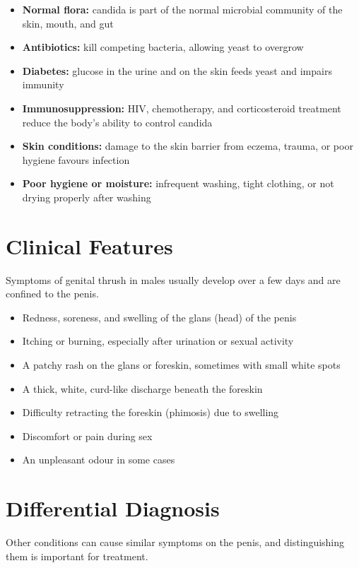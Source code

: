 \begin{itemize}
    \item \textbf{Normal flora:} candida is part of the normal microbial community of the skin, mouth, and gut
    \item \textbf{Antibiotics:} kill competing bacteria, allowing yeast to overgrow
    \item \textbf{Diabetes:} glucose in the urine and on the skin feeds yeast and impairs immunity
    \item \textbf{Immunosuppression:} HIV, chemotherapy, and corticosteroid treatment reduce the body's ability to control candida
    \item \textbf{Skin conditions:} damage to the skin barrier from eczema, trauma, or poor hygiene favours infection
    \item \textbf{Poor hygiene or moisture:} infrequent washing, tight clothing, or not drying properly after washing
\end{itemize}

\section*{Clinical Features}
Symptoms of genital thrush in males usually develop over a few days and are confined to the penis.

\begin{itemize}
    \item Redness, soreness, and swelling of the glans (head) of the penis
    \item Itching or burning, especially after urination or sexual activity
    \item A patchy rash on the glans or foreskin, sometimes with small white spots
    \item A thick, white, curd-like discharge beneath the foreskin
    \item Difficulty retracting the foreskin (phimosis) due to swelling
    \item Discomfort or pain during sex
    \item An unpleasant odour in some cases
\end{itemize}

\section*{Differential Diagnosis}
Other conditions can cause similar symptoms on the penis, and distinguishing them is important for treatment.

